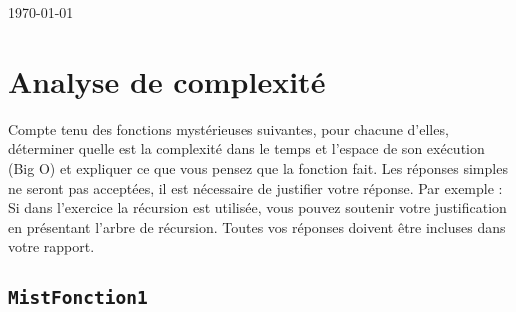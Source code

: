 \documentclass[10pt]{report}
\begin{document}
\begin{titlepage}
	
	
	\vfill\vfill\vfill %
	
	{\large\today} %
	
	
	 
	
	\vfill %

	
\end{titlepage}
\pagebreak
\tableofcontents
\pagebreak


  \vspace{-2em}
  \chapter{Analyse de complexité}

  \vspace{-2em}
  \begin{Exercice}{}{}
    Compte tenu des fonctions mystérieuses suivantes, pour chacune d’elles, 
    déterminer quelle est la complexité dans le temps et l’espace de son exécution 
    (Big O) et expliquer ce que vous pensez que la fonction fait. Les réponses 
    simples ne seront pas acceptées, il est nécessaire de justifier votre réponse.
    Par exemple : Si dans l’exercice la récursion est utilisée, vous pouvez 
    soutenir votre justification en présentant l’arbre de récursion. 
    Toutes vos réponses doivent être incluses dans votre rapport.
  \end{Exercice}
  \section{\texttt{MistFonction1}}
  \vspace{-3em}
  \vspace{-1em}
\end{document}
